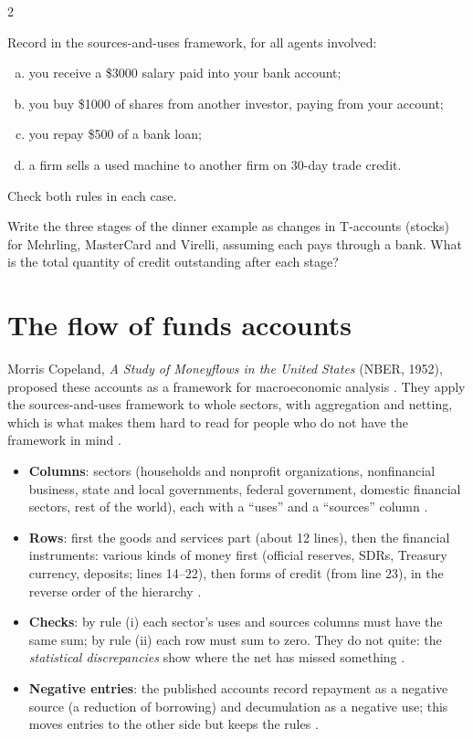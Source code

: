 \begin{paracol}{2}
\begin{exercise}
Record in the sources-and-uses framework, for all agents involved:
\begin{enumerate}[(a)]
  \item you receive a \$3000 salary paid into your bank account;
  \item you buy \$1000 of shares from another investor, paying from your account;
  \item you repay \$500 of a bank loan;
  \item a firm sells a used machine to another firm on 30-day trade credit.
\end{enumerate}
Check both rules in each case.
\end{exercise}

\begin{exercise}
Write the three stages of the dinner example as changes in T-accounts (stocks) for Mehrling, MasterCard and Virelli, assuming each pays
through a bank. What is the total quantity of credit outstanding after each stage?
\end{exercise}

\section{The flow of funds accounts}\label{sec:mv-fof}

Morris Copeland, \emph{A Study of Moneyflows in the United States} (NBER, 1952), proposed these accounts as a framework for
macroeconomic analysis . They apply the sources-and-uses framework to whole sectors, with aggregation and netting, which is
what makes them hard to read for people who do not have the framework in mind .
\begin{itemize}
  \item \textbf{Columns}: sectors (households and nonprofit organizations, nonfinancial business, state and local governments, federal
        government, domestic financial sectors, rest of the world), each with a ``uses'' and a ``sources'' column .
  \item \textbf{Rows}: first the goods and services part (about 12 lines), then the financial instruments: various kinds of money first
        (official reserves, SDRs, Treasury currency, deposits; lines 14--22), then forms of credit (from line 23), in the reverse order
        of the hierarchy .
  \item \textbf{Checks}: by rule (i) each sector's uses and sources columns must have the same sum; by rule (ii) each row must sum to zero.
        They do not quite: the \emph{statistical discrepancies} show where the net has missed something .
  \item \textbf{Negative entries}: the published accounts record repayment as a negative source (a reduction of borrowing) and
        decumulation as a negative use; this moves entries to the other side but keeps the rules .
\end{itemize}


\end{paracol}
